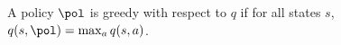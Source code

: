 \begin{definition}
\label{def: set of greedy policies}
    A policy $\pol$ is greedy with respect to $q$ if for all states $s$, $q(s, \pol) = \max_a q(s,a)$.
\end{definition}